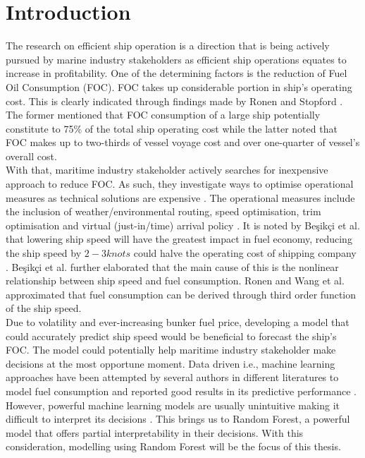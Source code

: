 \section{Introduction} \label{introduction}

The research on efficient ship operation is a direction that is being actively pursued by marine industry stakeholders as efficient ship operations equates to increase in profitability. One of the determining factors is the reduction of Fuel Oil Consumption (FOC). FOC takes up considerable portion in ship's operating cost. This is clearly indicated through findings made by Ronen \cite{Ronen.2011} and Stopford \cite{Stopford.2009}. The former mentioned that FOC consumption of a large ship potentially constitute to 75\% of the total ship operating cost while the latter noted that FOC makes up to two-thirds of vessel voyage cost and over one-quarter of vessel's overall cost. \\

With that, maritime industry stakeholder actively searches for inexpensive approach to reduce FOC. As such, they investigate ways to optimise operational measures as technical solutions are expensive \cite{Li.2022}. The operational measures include the inclusion of weather/environmental routing, speed optimisation, trim optimisation and virtual (just-in/time) arrival policy \cite{Li.2022}. It is noted by {Be{\c{s}}ik{\c{c}}i} et al. \cite{BalBesikci.2016} that lowering ship speed will have the greatest impact in fuel economy, reducing the ship speed by $2-3 knots$  could halve the operating cost of shipping company \cite{Stopford.2009,Wijnolst.2009}. {Be{\c{s}}ik{\c{c}}i} et al. further elaborated that the main cause of this is the nonlinear relationship between ship speed and fuel consumption. Ronen \cite{Ronen.1982,Ronen.2011} and Wang et al. \cite{Wang.2012} approximated that fuel consumption can be derived through third order function of the ship speed. \\

Due to volatility and ever-increasing bunker fuel price, developing a model that could accurately predict ship speed would be beneficial to forecast the ship's FOC. The model could potentially help maritime industry stakeholder make decisions at the most opportune moment. Data driven i.e., machine learning approaches have been attempted by several authors in different literatures to model fuel consumption and reported good results in its predictive performance \cite{BalBesikci.2016,Jeon.2018,Gkerekos.2019,Abebe.2020,Kim.2021}. However, powerful machine learning models are usually unintuitive making it difficult to interpret its decisions \cite{Geron.2019}. This brings us to Random Forest, a powerful model that offers partial interpretability in their decisions. With this consideration, modelling using Random Forest will be the focus of this thesis. 

